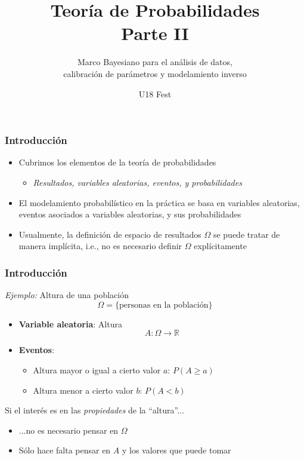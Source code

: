 \documentclass[xcolor=dvipsnames,10pt]{beamer}
\subtitle{Marco Bayesiano para el análisis de datos,\\
  calibración de parámetros y modelamiento inverso}
\title{Teoría de Probabilidades\\
  Parte II}%
\institute{Universidad Industrial de Santander}%
\date{U18 Fest}
\begin{document}
\begin{frame}[noframenumbering]
  \titlepage
\end{frame}

\begin{frame}
  \frametitle{Introducción}
  \begin{itemize}
  \item Cubrimos los elementos de la teoría de probabilidades
    \begin{itemize}
    \item \emph{Resultados, variables aleatorias, eventos, y probabilidades}
    \end{itemize}
  \item El modelamiento probabilístico en la práctica se basa en variables aleatorias, eventos asociados a variables aleatorias, y sus probabilidades
  \item Usualmente, la definición de espacio de resultados $\Omega$ se puede tratar de manera implícita, i.e., no es necesario definir $\Omega$ explícitamente
  \end{itemize}
\end{frame}
%
\begin{frame}
  \frametitle{Introducción}
  \emph{Ejemplo:} Altura de una población
  \begin{equation*}
    \Omega = \{ \text{personas en la población} \}
  \end{equation*}
  \begin{itemize}
  \item \textbf{Variable aleatoria}: Altura
    \begin{equation*}
      A \colon \Omega \to \mathbb{R}
    \end{equation*}
  \item \textbf{Eventos}:
    \begin{itemize}
    \item Altura mayor o igual a cierto valor $a$: $P(A \geq a)$
    \item Altura menor a cierto valor $b$: $P(A < b)$
    \end{itemize}
  \end{itemize}
  \pause
  Si el interés es en las \emph{propiedades} de la ``altura''...
  \begin{itemize}
  \item ...no es necesario pensar en $\Omega$
  \item Sólo hace falta pensar en $A$ y los valores que puede tomar
  \end{itemize}
\end{frame}
\end{document}
